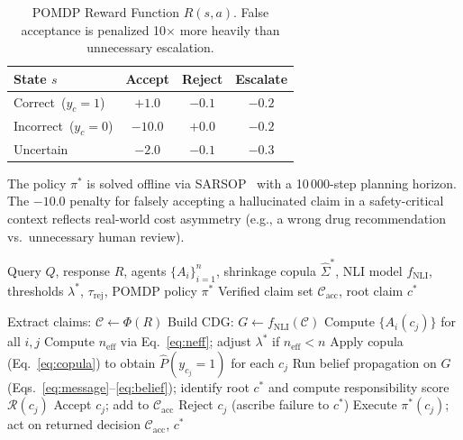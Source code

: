 \documentclass[conference]{IEEEtran}
\begin{document}
\begin{table}[htbp]
\caption{POMDP Reward Function $R(s, a)$.
         False acceptance is penalized 10$\times$ more heavily
         than unnecessary escalation.}
\label{tab:reward}
\centering
\begin{tabular}{lccc}
\toprule
State $s$ & Accept & Reject & Escalate \\
\midrule
Correct~($y_c = 1$)   & $+1.0$ & $-0.1$ & $-0.2$ \\
Incorrect~($y_c = 0$) & $-10.0$ & $+0.0$ & $-0.2$ \\
Uncertain             & $-2.0$  & $-0.1$ & $-0.3$ \\
\bottomrule
\end{tabular}
\end{table}

The policy $\pi^*$ is solved offline via
SARSOP~\cite{kurniawati2008} with a 10\,000-step planning horizon.
The $-10.0$ penalty for falsely accepting a hallucinated claim
in a safety-critical context reflects real-world cost asymmetry
(e.g., a wrong drug recommendation vs.\ unnecessary human review).

\begin{algorithm}[t]
\caption{ACCORD Inference Pipeline}
\label{alg:accord}
\begin{algorithmic}[1]
\REQUIRE Query $Q$, response $R$,
         agents $\{A_i\}_{i=1}^n$,
         shrinkage copula $\hat{\Sigma}^*$,
         NLI model $f_\text{NLI}$,
         thresholds $\lambda^*$, $\tau_\text{rej}$,
         POMDP policy $\pi^*$
\ENSURE  Verified claim set $\mathcal{C}_\text{acc}$,
         root claim $c^*$

\STATE Extract claims: $\mathcal{C} \leftarrow \Phi(R)$
\STATE Build CDG: $G \leftarrow f_\text{NLI}(\mathcal{C})$
\STATE Compute $\{A_i(c_j)\}$ for all $i, j$
\STATE Compute $n_\text{eff}$ via Eq.~\eqref{eq:neff};
       adjust $\lambda^*$ if $n_\text{eff} < n$
\STATE Apply copula (Eq.~\eqref{eq:copula}) to obtain
       $\hat{P}(y_{c_j}=1)$ for each $c_j$
\STATE Run belief propagation on $G$ (Eqs.\
       \ref{eq:message}--\ref{eq:belief}); identify root $c^*$
       and compute responsibility score $\mathcal{R}(c_j)$
    \STATE Accept $c_j$; add to $\mathcal{C}_\text{acc}$
    \STATE Reject $c_j$ (ascribe failure to $c^*$)
  \ELSE
    \STATE Execute $\pi^*(c_j)$; act on returned decision
  \ENDIF
\ENDFOR
\RETURN $\mathcal{C}_\text{acc}$, $c^*$
\end{algorithmic}
\end{algorithm}
\end{document}
